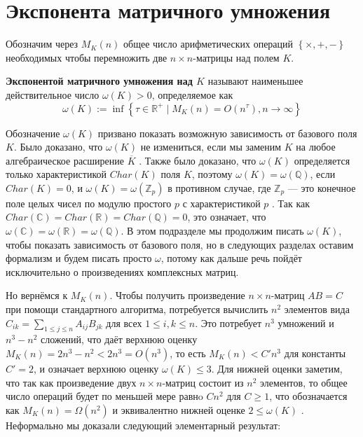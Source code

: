 \section{Экспонента матричного умножения}

Обозначим через $M_K(n)$ общее число арифметических операций $\left\{ \times , +, - \right\}$ необходимых чтобы перемножить две $n \times n$-матрицы над полем $K$.
\begin{definition}\label{def:omega}
	\textbf{Экспонентой матричного умножения над $K$} называют наименьшее действительное число $\omega(K) > 0$, определяемое как
	\[
		\omega(K) := \inf \left\{ \tau \in \mathbb{R}^+ \mid M_K(n) = O(n^\tau), n \to \infty \right\}
	\]
\end{definition}
Обозначение $\omega(K)$ призвано показать возможную зависимость от базового поля $K$. Было доказано, что $\omega(K)$ не измениться, если мы заменим $K$ на любое алгебраическое расширение $\overline{K}$ \cite[383]{bur}. Также было доказано, что $\omega(K)$ определяется только характеристикой $Char(K)$ поля $K$, поэтому $\omega(K) = \omega(\mathbb{Q})$, если $Char(K) = 0$, и $\omega(K) = \omega(\mathbb{Z}_p)$ в противном случае, где $\mathbb{Z}_p$ --- это конечное поле целых чисел по модулю простого $p$ с характеристикой $p$ \cite{Pan1984}. Так как $Char(\mathbb{C}) = Char(\mathbb{R}) = Char(\mathbb{Q}) = 0$, это означает, что $\omega(\mathbb{C}) = \omega(\mathbb{R}) = \omega(\mathbb{Q})$. В этом подразделе мы продолжим писать $\omega(K)$, чтобы показать зависимость от базового поля, но в следующих разделах оставим формализм и будем писать просто $\omega$, потому как дальше речь пойдёт исключительно о произведениях комплексных матриц.

Но вернёмся к $M_K(n)$. Чтобы получить произведение $n \times n$-матриц $A B = C$ при помощи стандартного алгоритма, потребуется вычислить $n^2$ элементов вида $C_{ik} = \sum_{1 \leq j \leq n} A_{ij} B_{jk}$ для всех $1 \leq i,k \leq n$. Это потребует $n^3$ умножений и $n^3 - n^2$ сложений, что даёт верхнюю оценку $M_K(n) = 2n^3 - n^2 < 2 n^3 = O(n^3)$, то есть $M_K(n) < C' n^3$ для константы $C' = 2$, и означает верхнюю оценку $\omega(K) \leq 3$. Для нижней оценки заметим, что так как произведение двух $n \times n$-матриц состоит из $n^2$ элементов, то общее число операций будет по меньшей мере равнo $C n^2$ для $C \geq 1$, что обозначается как $M_K(n) = \Omega(n^2)$ и эквивалентно нижней оценке $2 \leq \omega(K)$ \cite[375]{bur}. Неформально мы доказали следующий элементарный результат:

